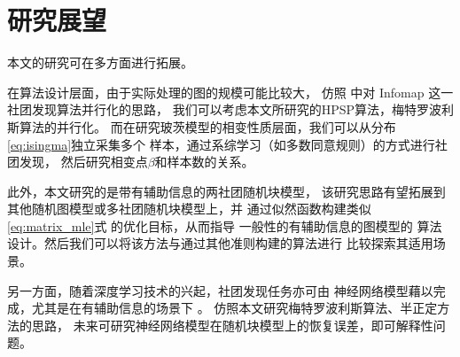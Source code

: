 \section{研究展望}
本文的研究可在多方面进行拓展。

在算法设计层面，由于实际处理的图的规模可能比较大，
仿照 \citet{faysal2021parallel} 中对 Infomap 这一社团发现算法并行化的思路，
我们可以考虑本文所研究的HPSP算法，梅特罗波利斯算法的并行化。
而在研究玻茨模型的相变性质层面，我们可以从分布
\eqref{eq:isingma}独立采集多个
样本，通过系综学习（如多数同意规则）的方式进行社团发现，
然后研究相变点$\beta$和样本数的关系。

此外，本文研究的是带有辅助信息的两社团随机块模型，
该研究思路有望拓展到其他随机图模型或多社团随机块模型上，并
通过似然函数构建类似\eqref{eq:matrix_mle}式
的优化目标，从而指导
一般性的有辅助信息的图模型的
算法设计。然后我们可以将该方法与通过其他准则\cite{chunaev2020community}构建的算法进行
比较探索其适用场景。

另一方面，随着深度学习技术的兴起，社团发现任务亦可由
神经网络模型藉以完成，尤其是在有辅助信息的场景下 \cite{cao2018incorporating}。
仿照本文研究梅特罗波利斯算法、半正定方法的思路，
未来可研究神经网络模型在随机块模型上的恢复误差，即可解释性问题。